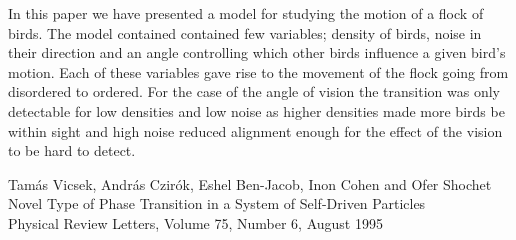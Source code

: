 \documentclass[twoside,twocolumn]{article}
\begin{document}
In this paper we have presented a model for studying the motion of a flock of birds.
The model contained contained few variables; density of birds, noise in their direction and an angle
controlling which other birds influence a given bird's motion. Each of these variables gave rise
to the movement of the flock going from disordered to ordered. For the case of the angle of vision
the transition was only detectable for low densities and low noise as higher densities made more
birds be within sight and high noise reduced alignment enough for the effect of the vision to be hard to detect.



\begin{thebibliography}{99} %

  Tamás Vicsek, András Czirók, Eshel Ben-Jacob, Inon Cohen and Ofer Shochet\\
  Novel Type of Phase Transition in a System of Self-Driven Particles\\
  Physical Review Letters, Volume 75, Number 6, August 1995
 
\end{thebibliography}

\end{document}
